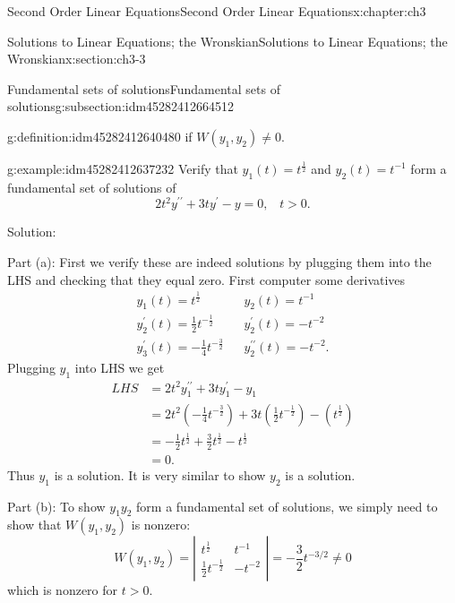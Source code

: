 \documentclass[oneside,10pt,]{book}
\numberwithin{equation}{section}
\numberwithin{equation}{section}
\newcommand{\amp}{&}
\begin{document}
\begin{chapterptx}{Second Order Linear Equations}{}{Second Order Linear Equations}{}{}{x:chapter:ch3}
\begin{sectionptx}{Solutions to Linear Equations; the Wronskian}{}{Solutions to Linear Equations; the Wronskian}{}{}{x:section:ch3-3}
\begin{subsectionptx}{Fundamental sets of solutions}{}{Fundamental sets of solutions}{}{}{g:subsection:idm45282412664512}
\begin{definition}{}{g:definition:idm45282412640480}
if \(W\left(y_{1},y_{2}\right)\neq0\).%
\end{definition}
\begin{example}{}{g:example:idm45282412637232}%
Verify that \(y_{1}(t)=t^{\frac{1}{2}}\) and \(y_{2}(t)=t^{-1}\) form a fundamental set of solutions of%
\begin{equation*}
2t^{2}y^{\prime\prime}+3ty^{\prime}-y=0,\,\,\,\,\,t>0.
\end{equation*}
%
\par
Solution:%
\par
Part (a): First we verify these are indeed solutions by plugging them into the LHS and checking that they equal zero. First computer some derivatives%
\begin{equation*}
\begin{array}{ccc}
y_{1}(t)=t^{\frac{1}{2}} \amp  \amp y_{2}(t)=t^{-1}\\
y_{2}^{\prime}(t)=\frac{1}{2}t^{-\frac{1}{2}} \amp  \amp y_{2}^{\prime}(t)=-t^{-2}\\
y_{3}^{\prime}(t)=-\frac{1}{4}t^{-\frac{3}{2}} \amp  \amp y_{2}^{\prime\prime}(t)=-t^{-2}.
\end{array}
\end{equation*}
Plugging \(y_{1}\) into LHS we get%
\begin{align*}
LHS \amp =2t^{2}y_{1}^{\prime\prime}+3ty_{1}^{\prime}-y_{1}\\
\amp =2t^{2}\left(-\frac{1}{4}t^{-\frac{3}{2}}\right)+3t\left(\frac{1}{2}t^{-\frac{1}{2}}\right)-\left(t^{\frac{1}{2}}\right)\\
\amp =-\frac{1}{2}t^{\frac{1}{2}}+\frac{3}{2}t^{\frac{1}{2}}-t^{\frac{1}{2}}\\
\amp =0.
\end{align*}
Thus \(y_{1}\) is a solution. It is very similar to show \(y_{2}\) is a solution.%
\par
Part (b): To show \(y_{1}y_{2}\) form a fundamental set of solutions, we simply need to show that \(W(y_{1},y_{2})\) is nonzero:%
\begin{equation*}
W(y_{1},y_{2})=\left|\begin{array}{cc}
t^{\frac{1}{2}} \amp t^{-1}\\
\frac{1}{2}t^{-\frac{1}{2}} \amp -t^{-2}
\end{array}\right|=-\frac{3}{2}t^{-3/2}\neq0
\end{equation*}
which is nonzero for \(t>0\).%
\end{example}
\end{subsectionptx}
\end{sectionptx}

\end{chapterptx}
\end{document}
